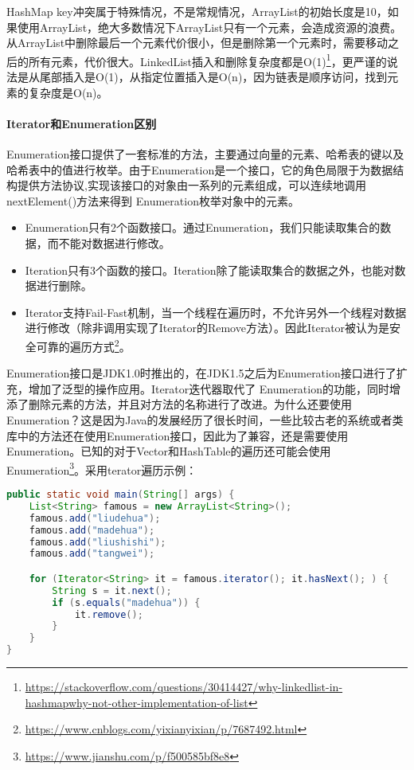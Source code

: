 \documentclass[../../../interview-questions.tex]{subfiles}
\begin{document}
HashMap key冲突属于特殊情况，不是常规情况，ArrayList的初始长度是10，如果使用ArrayList，绝大多数情况下ArrayList只有一个元素，会造成资源的浪费。从ArrayList中删除最后一个元素代价很小，但是删除第一个元素时，需要移动之后的所有元素，代价很大。LinkedList插入和删除复杂度都是O(1)\footnote{\url{https://stackoverflow.com/questions/30414427/why-linkedlist-in-hashmapwhy-not-other-implementation-of-list}}，更严谨的说法是从尾部插入是O(1)，从指定位置插入是O(n)，因为链表是顺序访问，找到元素的复杂度是O(n)。

\paragraph{Iterator和Enumeration区别}

Enumeration接口提供了一套标准的方法，主要通过向量的元素、哈希表的键以及哈希表中的值进行枚举。由于Enumeration是一个接口，它的角色局限于为数据结构提供方法协议,实现该接口的对象由一系列的元素组成，可以连续地调用nextElement()方法来得到 Enumeration枚举对象中的元素。

\begin{itemize}
    \item {Enumeration只有2个函数接口。通过Enumeration，我们只能读取集合的数据，而不能对数据进行修改。}
    \item {Iteration只有3个函数的接口。Iteration除了能读取集合的数据之外，也能对数据进行删除。}
    \item {Iterator支持Fail-Fast机制，当一个线程在遍历时，不允许另外一个线程对数据进行修改（除非调用实现了Iterator的Remove方法）。因此Iterator被认为是安全可靠的遍历方式\footnote{\url{https://www.cnblogs.com/yixianyixian/p/7687492.html}}。}
\end{itemize}

Enumeration接口是JDK1.0时推出的，在JDK1.5之后为Enumeration接口进行了扩充，增加了泛型的操作应用。Iterator迭代器取代了 Enumeration的功能，同时增添了删除元素的方法，并且对方法的名称进行了改进。为什么还要使用Enumeration？这是因为Java的发展经历了很长时间，一些比较古老的系统或者类库中的方法还在使用Enumeration接口，因此为了兼容，还是需要使用Enumeration。已知的对于Vector和HashTable的遍历还可能会使用Enumeration\footnote{\url{https://www.jianshu.com/p/f500585bf8e8}}。采用terator遍历示例：

\begin{lstlisting}[language=Java]
public static void main(String[] args) {
    List<String> famous = new ArrayList<String>();
    famous.add("liudehua");
    famous.add("madehua");
    famous.add("liushishi");
    famous.add("tangwei");

    for (Iterator<String> it = famous.iterator(); it.hasNext(); ) {
        String s = it.next();
        if (s.equals("madehua")) {
            it.remove();
        }
    }
}
\end{lstlisting}
\end{document}

